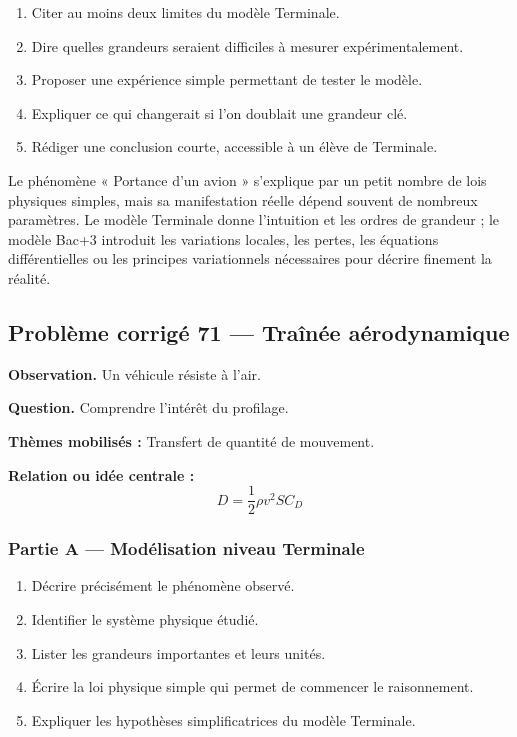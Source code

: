 \documentclass[11pt,a4paper]{article}
\begin{document}
\begin{enumerate}
  \item Citer au moins deux limites du modèle Terminale.
  \item Dire quelles grandeurs seraient difficiles à mesurer expérimentalement.
  \item Proposer une expérience simple permettant de tester le modèle.
  \item Expliquer ce qui changerait si l'on doublait une grandeur clé.
  \item Rédiger une conclusion courte, accessible à un élève de Terminale.
\end{enumerate}

\begin{corrigebox}
Le phénomène « Portance d'un avion » s'explique par un petit nombre de lois physiques simples, mais sa manifestation réelle dépend souvent de nombreux paramètres. Le modèle Terminale donne l'intuition et les ordres de grandeur ; le modèle Bac+3 introduit les variations locales, les pertes, les équations différentielles ou les principes variationnels nécessaires pour décrire finement la réalité.
\end{corrigebox}

\subsection{Problème corrigé 71 — Traînée aérodynamique}

\begin{exercicebox}
\textbf{Observation.} Un véhicule résiste à l'air.

\medskip
\textbf{Question.} Comprendre l'intérêt du profilage.

\medskip
\textbf{Thèmes mobilisés :} Transfert de quantité de mouvement.

\medskip
\textbf{Relation ou idée centrale :}
\[
D=\frac12\rho v^2SC_D
\]
\end{exercicebox}

\subsubsection*{Partie A — Modélisation niveau Terminale}

\begin{enumerate}
  \item Décrire précisément le phénomène observé.
  \item Identifier le système physique étudié.
  \item Lister les grandeurs importantes et leurs unités.
  \item Écrire la loi physique simple qui permet de commencer le raisonnement.
  \item Expliquer les hypothèses simplificatrices du modèle Terminale.
\end{enumerate}
\end{document}
